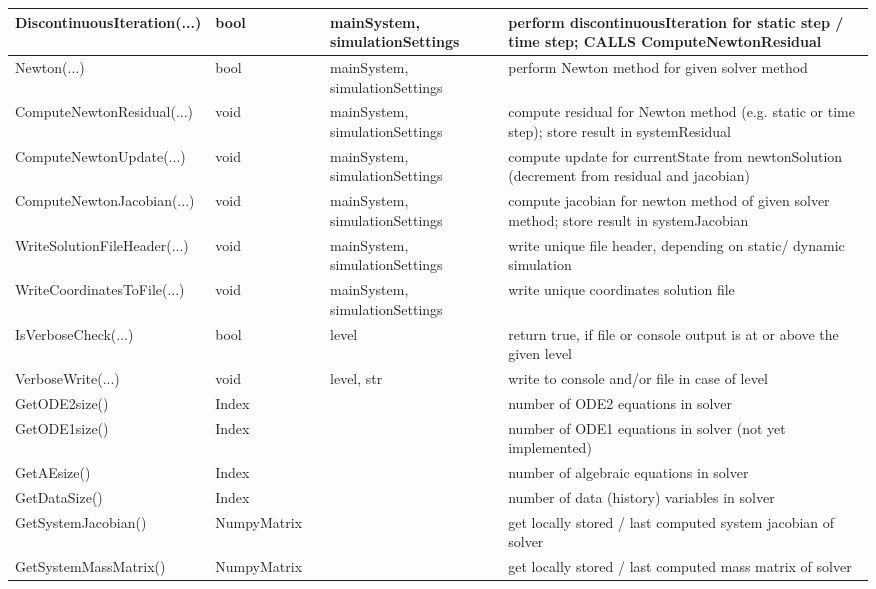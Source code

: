 \begin{center}
\begin{longtable}{| p{4.2cm} | p{2.5cm} | p{0.3cm} | p{3.0cm} | p{6cm} |}
    DiscontinuousIteration(...) &     bool &      &     mainSystem, simulationSettings &     perform discontinuousIteration for static step / time step; CALLS ComputeNewtonResidual\\ \hline
    Newton(...) &     bool &      &     mainSystem, simulationSettings &     perform Newton method for given solver method\\ \hline
    ComputeNewtonResidual(...) &     void &      &     mainSystem, simulationSettings &     compute residual for Newton method (e.g. static or time step); store result in systemResidual\\ \hline
    ComputeNewtonUpdate(...) &     void &      &     mainSystem, simulationSettings &     compute update for currentState from newtonSolution (decrement from residual and jacobian)\\ \hline
    ComputeNewtonJacobian(...) &     void &      &     mainSystem, simulationSettings &     compute jacobian for newton method of given solver method; store result in systemJacobian\\ \hline
    WriteSolutionFileHeader(...) &     void &      &     mainSystem, simulationSettings &     write unique file header, depending on static/ dynamic simulation\\ \hline
    WriteCoordinatesToFile(...) &     void &      &     mainSystem, simulationSettings &     write unique coordinates solution file\\ \hline
    IsVerboseCheck(...) &     bool &      &     level &     return true, if file or console output is at or above the given level\\ \hline
    VerboseWrite(...) &     void &      &     level, str &     write to console and/or file in case of level\\ \hline
    GetODE2size() &     Index &      &      &     number of ODE2 equations in solver\\ \hline
    GetODE1size() &     Index &      &      &     number of ODE1 equations in solver (not yet implemented)\\ \hline
    GetAEsize() &     Index &      &      &     number of algebraic equations in solver\\ \hline
    GetDataSize() &     Index &      &      &     number of data (history) variables in solver\\ \hline
    GetSystemJacobian() &     NumpyMatrix &      &      &     get locally stored / last computed system jacobian of solver\\ \hline
    GetSystemMassMatrix() &     NumpyMatrix &      &      &     get locally stored / last computed mass matrix of solver\\ \hline

\end{longtable}
\end{center}
